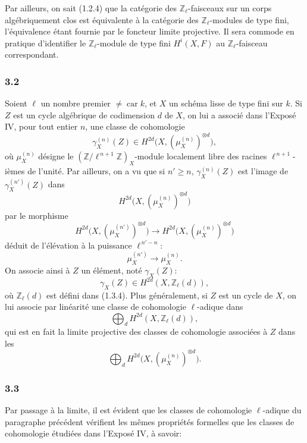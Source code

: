 \documentclass[11pt]{article}
\newcommand{\car}{\operatorname{car}}
\providecommand{\car}{\operatorname{car}}
\providecommand{\car}{\operatorname{car}}
\providecommand{\car}{\operatorname{car}}
\begin{document}
Par ailleurs, on sait (1.2.4) que la catégorie des \(\mathbb Z_\ell\)-faisceaux sur un corps algébriquement clos est équivalente à la catégorie des \(\mathbb Z_\ell\)-modules de type fini, l'équivalence étant fournie par le foncteur limite projective. Il sera commode en pratique d'identifier le \(\mathbb Z_\ell\)-module de type fini \(H^i(X,F)\) au \(\mathbb Z_\ell\)-faisceau correspondant.

\subsubsection*{3.2}
Soient \(\ell\) un nombre premier \(\ne\car k\), et \(X\) un schéma lisse de type fini sur \(k\). Si \(Z\) est un cycle algébrique de codimension \(d\) de \(X\), on lui a associé dans l'Exposé IV, pour tout entier \(n\), une classe de cohomologie
\[
\gamma_X^{(n)}(Z)\in H^{2d}\bigl(X,(\mu_X^{(n)})^{\otimes d}\bigr),
\]
où \(\mu_X^{(n)}\) désigne le \((\mathbb Z/\ell^{\,n+1}\mathbb Z)_X\)-module localement libre des racines \(\ell^{\,n+1}\)-ièmes de l'unité. Par ailleurs, on a vu que si \(n'\ge n\), \(\gamma_X^{(n)}(Z)\) est l'image de \(\gamma_X^{(n')}(Z)\) dans
\[
H^{2d}\bigl(X,(\mu_X^{(n)})^{\otimes d}\bigr)
\]
par le morphisme
\[
H^{2d}\bigl(X,(\mu_X^{(n')})^{\otimes d}\bigr)
\longrightarrow
H^{2d}\bigl(X,(\mu_X^{(n)})^{\otimes d}\bigr)
\]
déduit de l'élévation à la puissance \(\ell^{\,n'-n}\):
\[
\mu_X^{(n')}\longrightarrow \mu_X^{(n)}.
\]
On associe ainsi à \(Z\) un élément, noté \(\gamma_X(Z)\):
\[
\gamma_X(Z)\in H^{2d}(X,\mathbb Z_\ell(d)),
\]
où \(\mathbb Z_\ell(d)\) est défini dans (1.3.4). Plus généralement, si \(Z\) est un cycle de \(X\), on lui associe par linéarité une classe de cohomologie \(\ell\)-adique dans
\[
\bigoplus_d H^{2d}(X,\mathbb Z_\ell(d)),
\]
qui est en fait la limite projective des classes de cohomologie associées à \(Z\) dans les
\[
\bigoplus_d H^{2d}\bigl(X,(\mu_X^{(n)})^{\otimes d}\bigr).
\]

\subsubsection*{3.3}
Par passage à la limite, il est évident que les classes de cohomologie \(\ell\)-adique du paragraphe précédent vérifient les mêmes propriétés formelles que les classes de cohomologie étudiées dans l'Exposé IV, à savoir:
\end{document}
